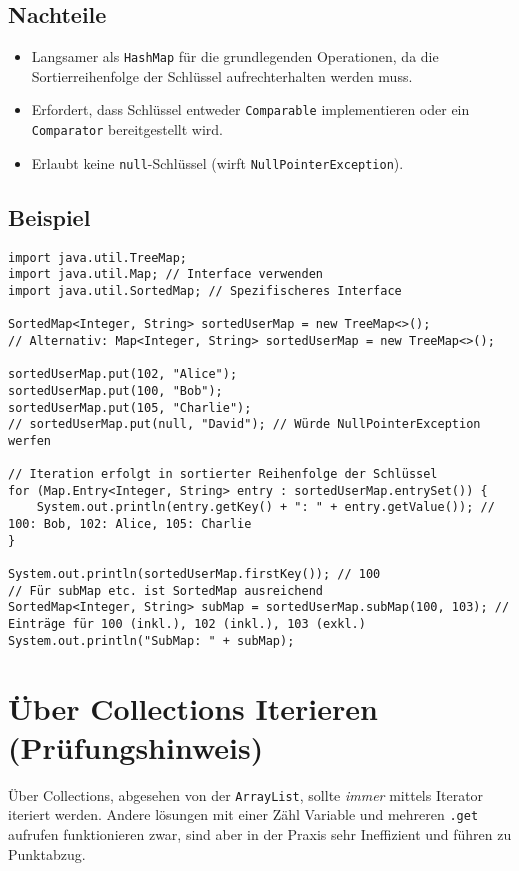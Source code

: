 \subsection{Nachteile}
\begin{itemize}
    \item Langsamer als \texttt{HashMap} für die grundlegenden Operationen, da die
          Sortierreihenfolge der Schlüssel aufrechterhalten werden muss.
    \item Erfordert, dass Schlüssel entweder \texttt{Comparable} implementieren oder ein
          \texttt{Comparator} bereitgestellt wird.
    \item Erlaubt keine \texttt{null}-Schlüssel (wirft \texttt{NullPointerException}).
\end{itemize}

\subsection{Beispiel}
\begin{lstlisting}[caption={Beispiel für die Verwendung einer TreeMap in Java}, label=lst:treeMapExample]
import java.util.TreeMap;
import java.util.Map; // Interface verwenden
import java.util.SortedMap; // Spezifischeres Interface

SortedMap<Integer, String> sortedUserMap = new TreeMap<>();
// Alternativ: Map<Integer, String> sortedUserMap = new TreeMap<>();

sortedUserMap.put(102, "Alice");
sortedUserMap.put(100, "Bob");
sortedUserMap.put(105, "Charlie");
// sortedUserMap.put(null, "David"); // Würde NullPointerException werfen

// Iteration erfolgt in sortierter Reihenfolge der Schlüssel
for (Map.Entry<Integer, String> entry : sortedUserMap.entrySet()) {
    System.out.println(entry.getKey() + ": " + entry.getValue()); // 100: Bob, 102: Alice, 105: Charlie
}

System.out.println(sortedUserMap.firstKey()); // 100
// Für subMap etc. ist SortedMap ausreichend
SortedMap<Integer, String> subMap = sortedUserMap.subMap(100, 103); // Einträge für 100 (inkl.), 102 (inkl.), 103 (exkl.)
System.out.println("SubMap: " + subMap);
\end{lstlisting}

\section{Über Collections Iterieren (Prüfungshinweis)}
Über Collections, abgesehen von der \lstinline{ArrayList}, sollte \textit{immer} mittels
Iterator iteriert werden. Andere lösungen mit einer Zähl Variable und mehreren
\lstinline{.get} aufrufen funktionieren zwar, sind aber in der Praxis sehr Ineffizient
und führen zu Punktabzug.